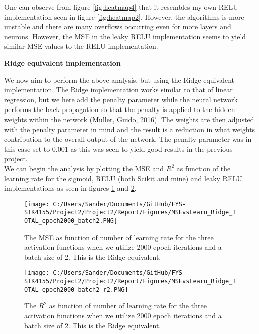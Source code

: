 \documentclass[12pt,a4paper]{article}
\begin{document}
\noindent One can observe from figure \ref{fig:heatmap4} that it resembles my own RELU implementation seen in figure \ref{fig:heatmap2}. However, the algorithms is more unstable and there are many overflows occurring even for more layers and neurons. However, the MSE in the leaky RELU implementation seems to yield similar MSE values to the RELU implementation.

\begin{center}
\large{\textbf{Ridge equivalent implementation}}
\end{center}

\noindent We now aim to perform the above analysis, but using the Ridge equivalent implementation. The Ridge implementation works similar to that of linear regression, but we here add the penalty parameter while the neural network performs the back propagation so that the penalty is applied to the hidden weights within the network (Muller, Guido, 2016). The weights are then adjusted with the penalty parameter in mind and the result is a reduction in what weights contribution to the overall output of the network. The penalty parameter was in this case set to $0.001$ as this was seen to yield good results in the previous project. 
\\
We can begin the analysis by plotting the MSE and $R^2$ as function of the learning rate for the sigmoid, RELU (both Scikit and mine) and leaky RELU implementations as seen in figures \ref{fig:MSEvsLrateTOTAL9} and \ref{fig:MSEvsLrateTOTAL10}.

\begin{figure}[H]
\centering
\texttt{[image: C:/Users/Sander/Documents/GitHub/FYS-STK4155/Project2/Project2/Report/Figures/MSEvsLearn\_Ridge\_TOTAL\_epoch2000\_batch2.PNG]}
\caption{\label{fig:MSEvsLrateTOTAL9} The MSE as function of number of learning rate for the three activation functions when we utilize 2000 epoch iterations and a batch size of 2. This is the Ridge equivalent.}
\end{figure}

\begin{figure}[H]
\centering
\texttt{[image: C:/Users/Sander/Documents/GitHub/FYS-STK4155/Project2/Project2/Report/Figures/MSEvsLearn\_Ridge\_TOTAL\_epoch2000\_batch2\_r2.PNG]}
\caption{\label{fig:MSEvsLrateTOTAL10} The $R^2$ as function of number of learning rate for the three activation functions when we utilize 2000 epoch iterations and a batch size of 2. This is the Ridge equivalent.}
\end{figure}
\end{document}
